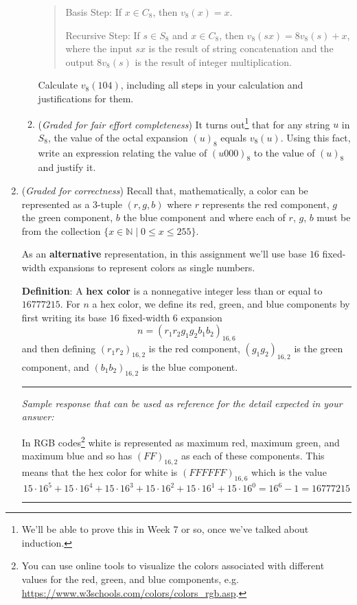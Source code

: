 \begin{enumerate}
\begin{enumerate}
    \begin{quote}
    Basis Step: If $x \in C_8$, then $v_8 (x) = x$.
    
    Recursive Step: If $s \in S_8$ and $x \in C_8$, then $v_8 (sx) = 8v_8(s) + x$, where 
    the input $sx$ is the result of string concatenation and the output $8 v_8 (s)$
    is the result of integer multiplication.
    \end{quote}

    Calculate $v_8(104)$, including all steps in your calculation and justifications for them.

    \item ({\it Graded for fair effort completeness})
    It turns out\footnote{We'll be able to prove this in Week 7 or so, once
    we've talked about induction.} that for any string $u$ in $S_8$, the value of the 
    octal expansion $(u)_8$ equals $v_8(u)$. Using this fact, write an expression 
    relating the value of $(u000)_8$ to the value of $(u)_8$ and justify it. 
    \end{enumerate}
    
    
    \item ({\it Graded for correctness}) 
    Recall that, mathematically, a color can be represented as a 
    $3$-tuple $(r, g, b)$ where $r$
    represents the red component, $g$ the green component, $b$ the blue component 
    and where each of $r$, $g$, $b$ must be from the collection 
    $\{x \in \mathbb{N}\mid 0 \leq x \leq 255 \}$.
    
    As an {\bf alternative} representation, in this assignment
    we'll use base $16$ fixed-width expansions to represent colors
    as single numbers.
    
    {\bf Definition}: A {\bf hex color} is a nonnegative
    integer less than or equal to $16777215$. 
    For $n$ a hex color, we define its red, green, and blue components
    by first writing its base $16$ fixed-width $6$ expansion
    $$n = (r_1r_2g_1g_2b_1b_2)_{16,6}$$ and 
    then defining
    $(r_1r_2)_{16,2}$ is the red
    component, $(g_1g_2)_{16,2}$ is the green component, and $(b_1b_2)_{16,2}$ is the
    blue component.
    
    \newpage
    \rule{0.5\textwidth}{.4pt}

    {\it Sample response that can be used as reference for the detail expected 
    in your answer:} 
    
    In RGB codes\footnote{You can use online tools to visualize the colors associated
    with different values for the red, green, and blue components, 
    e.g. \url{https://www.w3schools.com/colors/colors_rgb.asp}. }
    white is represented as maximum red, maximum green, and maximum blue 
    and so has
    $(FF)_{16,2}$ as each of these components. This means that the hex color for white
    is $(FFFFFF)_{16,6}$ which is the value 
    \[
        15\cdot 16^5 + 15 \cdot 16^4 + 15 \cdot 16^3 + 15 \cdot 16^2 + 15 \cdot 16^1 + 15 \cdot 16^0 
        = 16^6 - 1 = 16777215
    \]
    \rule{0.5\textwidth}{.4pt}


\end{enumerate}
